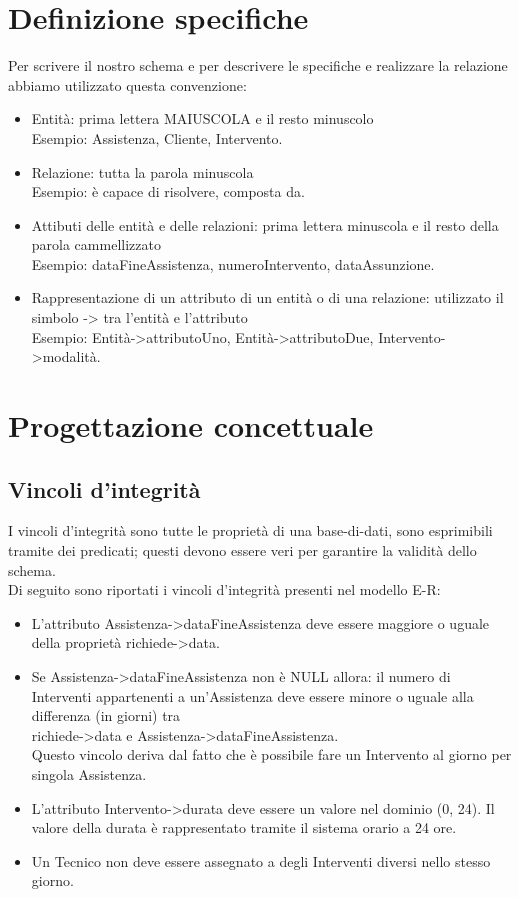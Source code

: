 \documentclass[legalpaper]{article}
\begin{document}
\section{Definizione specifiche}
Per scrivere il nostro schema e per descrivere le specifiche e realizzare la relazione abbiamo utilizzato questa convenzione:
\begin{itemize}
\item Entità: prima lettera MAIUSCOLA e il resto minuscolo\\
Esempio: Assistenza, Cliente, Intervento.
\item Relazione: tutta la parola minuscola\\
Esempio: è capace di risolvere, composta da.
\item Attibuti delle entità e delle relazioni: prima lettera minuscola e il resto della parola cammellizzato\\
Esempio: dataFineAssistenza, numeroIntervento, dataAssunzione.
\item Rappresentazione di un attributo di un entità o di una relazione: utilizzato il simbolo      ->      tra l'entità e l'attributo\\
Esempio: Entità->attributoUno, Entità->attributoDue, Intervento->modalità.
\end{itemize}

\section{Progettazione concettuale}

\subsection{Vincoli d'integrità}
I vincoli d'integrità sono tutte le proprietà di una base-di-dati, sono esprimibili 
tramite dei predicati; questi devono essere veri per garantire la validità dello schema.\\
\newline
Di seguito sono riportati i vincoli d'integrità presenti nel modello E-R:
\begin{itemize}
    \item L'attributo Assistenza->dataFineAssistenza deve essere maggiore o uguale\\ della proprietà richiede->data.
    \item Se Assistenza->dataFineAssistenza non è NULL allora: il numero di Interventi appartenenti a un'Assistenza deve essere minore o uguale alla differenza (in giorni) tra \\richiede->data e Assistenza->dataFineAssistenza.\\Questo vincolo deriva dal fatto che è possibile fare un Intervento al giorno per singola Assistenza.
   \item L'attributo Intervento->durata deve essere un valore nel dominio (0, 24).
Il valore della durata è rappresentato tramite il sistema orario a 24 ore.
  \item Un Tecnico non deve essere assegnato a degli Interventi diversi nello stesso giorno.
 
\end{itemize}
\end{document}

